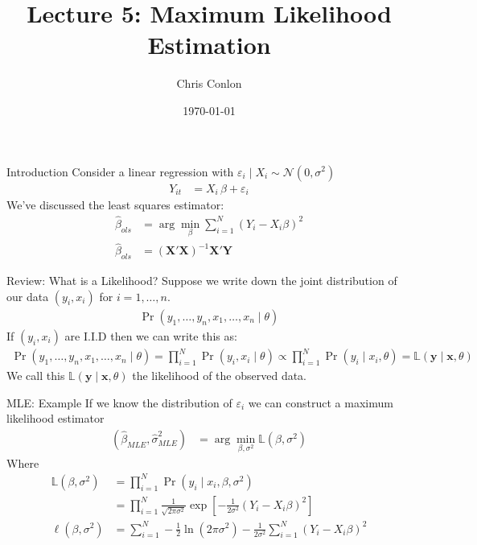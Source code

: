 \documentclass[aspectratio=169,11pt]{beamer}
\title{Lecture 5: Maximum Likelihood Estimation}
\author{Chris Conlon }
\institute{NYU Stern }
\date{\today}
\begin{document}
\maketitle

\begin{frame}{Introduction}
Consider a linear regression with $\varepsilon_i \mid X_i \sim \mathcal{N}(0,\sigma^2)$
\begin{align*}
Y_{it} &= X_{i}\, \beta + \varepsilon_{i}
\end{align*}
We've discussed the \alert{least squares estimator}:
\begin{align*}
\widehat{\beta}_{ols} &= \arg \min_{\beta} \sum_{i=1}^N (Y_i - X_i \beta)^2\\
\widehat{\beta}_{ols} &= (\mathbf{X}'\mathbf{X})^{-1} \mathbf{X}' \mathbf{Y}
\end{align*}
\end{frame}


\begin{frame}{Review: What is a Likelihood?}
Suppose we write down the joint distribution of our data $(y_i,x_i)$ for $i=1,\ldots,n$.
\begin{align*}
\Pr(y_1,\ldots,y_n, x_1,\ldots,x_n \mid  \theta)
\end{align*}
If  $(y_i,x_i)$ are I.I.D then we can write this as:
\begin{align*}
 \Pr(y_1,\ldots,y_n, x_1,\ldots,x_n \mid \theta) = \prod_{i=1}^N \Pr(y_i, x_i \mid \theta) \propto \prod_{i=1}^N \Pr(y_i \mid x_i , \theta)=\mathbb{L}( \mathbf{y} \mid \mathbf{x} ,\theta )
\end{align*}
We call this $\mathbb{L}( \mathbf{y}\mid \mathbf{x} ,\theta )$ the \alert{likelihood} of the observed data.
\end{frame}




\begin{frame}{MLE: Example}
If we know the distribution of $\varepsilon_i$ we can construct a \alert{maximum likelihood estimator}
\begin{align*}
(\widehat{\beta}_{MLE},\widehat{\sigma}^2_{MLE}) &= \arg \min_{\beta,\sigma^2} \mathbb{L}(\beta,\sigma^2)
\end{align*}
Where 
\begin{align*} 
\mathbb{L}(\beta,\sigma^2) &= \prod_{i=1}^N \Pr(y_i \mid x_i,\beta,\sigma^2) \\
                  &= \prod_{i=1}^N \frac{1}{\sqrt{2 \pi \sigma^2}} \exp \left[-\frac{1}{2\sigma^2}(Y_i - X_i \beta)^2 \right]\\
\ell(\beta,\sigma^2) &= \sum_{i=1}^N -\frac{1}{2} \ln (2 \pi \sigma^2) - \frac{1}{2 \sigma^2} \sum_{i=1}^N(Y_i - X_i \beta)^2
\end{align*}
\end{frame}
\end{document}
